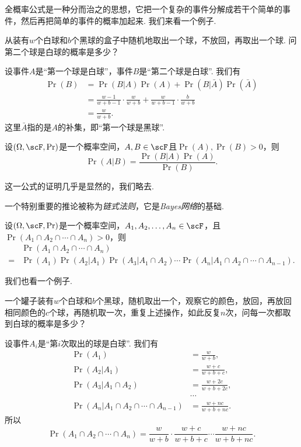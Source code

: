 全概率公式是一种分而治之的思想，它把一个复杂的事件分解成若干个简单的事件，然后再把简单的事件的概率加起来. 我们来看一个例子. 

\begin{example}
    从装有$w$个白球和$b$个黑球的盒子中随机地取出一个球，不放回，再取出一个球. 问第二个球是白球的概率是多少？

    设事件$A$是“第一个球是白球”，事件$B$是“第二个球是白球”. 我们有
\begin{align*}
    \Pr(B) &= \Pr(B|A)\Pr(A) + \Pr(B|\bar{A})\Pr(\bar{A}) \\
    &=\frac{w-1}{w+b-1}\cdot\frac{w}{w+b} + \frac{w}{w+b-1}\cdot\frac{b}{w+b}\\
    &=\frac{w}{w+b}.
\end{align*}
    这里$\bar A$指的是$A$的补集，即“第一个球是黑球”. 
\end{example}

\begin{theorem}[贝叶斯公式]\label{thm:bayes}
设$(\Omega,\scF,\Pr)$是一个概率空间，$A,B\in\scF$且$\Pr(A),\Pr(B)>0$，则
\[
    \Pr(A|B) = \frac{\Pr(B|A)\Pr(A)}{\Pr(B)}.
\]
\end{theorem}

这一公式的证明几乎是显然的，我们略去. 

一个特别重要的推论被称为\emph{链式法则}，它是\emph{Bayes网络}的基础. 

\begin{corollary}[链式法则]\label{cor:chain-rule}
设$(\Omega,\scF,\Pr)$是一个概率空间，$A_1,A_2,\ldots,A_n\in\scF$，且$\Pr(A_1\cap A_2\cap\cdots\cap A_n)>0$，则
\begin{align*}
    &\Pr(A_1\cap A_2\cap\cdots\cap A_n)\\
    = &\Pr(A_1)\Pr(A_2|A_1)\Pr(A_3|A_1\cap A_2)\cdots\Pr(A_n|A_1\cap A_2\cap\cdots\cap A_{n-1}).
\end{align*}
\end{corollary}

我们也看一个例子. 

\begin{example}[P\'olya的罐子]
    一个罐子装有$w$个白球和$b$个黑球，随机取出一个，观察它的颜色，放回，再放回相同颜色的$c$个球，再随机取一次，重复上述操作，如此反复$n$次，问每一次都取到白球的概率是多少？

    设事件$A_i$是“第$i$次取出的球是白球”. 我们有
\begin{align*}
    \Pr(A_1)&=\frac{w}{w+b},\\
    \Pr(A_2|A_1)&=\frac{w+c}{w+b+c},\\
    \Pr(A_3|A_1\cap A_2)&=\frac{w+2c}{w+b+2c},\\
    &\cdots\\
    \Pr(A_n|A_1\cap A_2\cap\cdots\cap A_{n-1})&=\frac{w+nc}{w+b+nc}.
\end{align*}
    所以
\[
    \Pr(A_1\cap A_2\cap\cdots\cap A_n) = \frac{w}{w+b}\cdot\frac{w+c}{w+b+c}\cdots\frac{w+nc}{w+b+nc}.
\]
\end{example}

